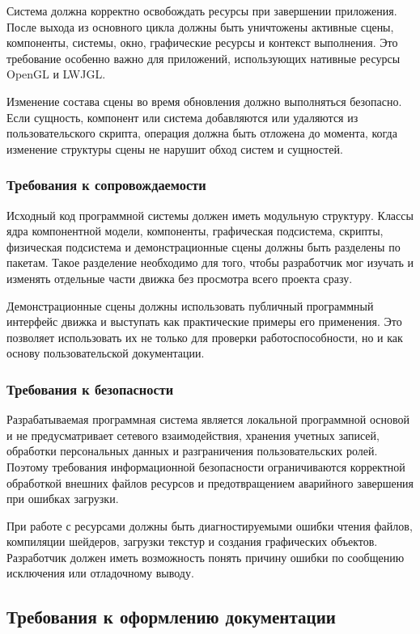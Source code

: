 Система должна корректно освобождать ресурсы при завершении приложения. После выхода из основного цикла должны быть уничтожены активные сцены, компоненты, системы, окно, графические ресурсы и контекст выполнения. Это требование особенно важно для приложений, использующих нативные ресурсы OpenGL и LWJGL.

Изменение состава сцены во время обновления должно выполняться безопасно. Если сущность, компонент или система добавляются или удаляются из пользовательского скрипта, операция должна быть отложена до момента, когда изменение структуры сцены не нарушит обход систем и сущностей.

\subsubsection{Требования к сопровождаемости}

Исходный код программной системы должен иметь модульную структуру. Классы ядра компонентной модели, компоненты, графическая подсистема, скрипты, физическая подсистема и демонстрационные сцены должны быть разделены по пакетам. Такое разделение необходимо для того, чтобы разработчик мог изучать и изменять отдельные части движка без просмотра всего проекта сразу.

Демонстрационные сцены должны использовать публичный программный интерфейс движка и выступать как практические примеры его применения. Это позволяет использовать их не только для проверки работоспособности, но и как основу пользовательской документации.

\subsubsection{Требования к безопасности}

Разрабатываемая программная система является локальной программной основой и не предусматривает сетевого взаимодействия, хранения учетных записей, обработки персональных данных и разграничения пользовательских ролей. Поэтому требования информационной безопасности ограничиваются корректной обработкой внешних файлов ресурсов и предотвращением аварийного завершения при ошибках загрузки.

При работе с ресурсами должны быть диагностируемыми ошибки чтения файлов, компиляции шейдеров, загрузки текстур и создания графических объектов. Разработчик должен иметь возможность понять причину ошибки по сообщению исключения или отладочному выводу.

\subsection{Требования к оформлению документации}

